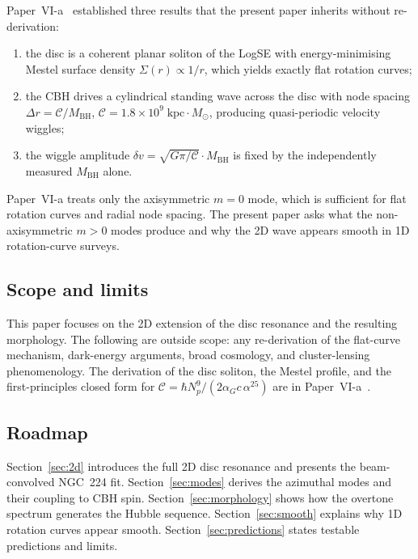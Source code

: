 \documentclass[11pt,a4paper]{article}
\begin{document}
Paper~VI-a~\cite{SSV-VIa} established three results that the present paper inherits
without re-derivation:
\begin{enumerate}
  \item the disc is a coherent planar soliton of the LogSE with energy-minimising Mestel
    surface density $\Sigma(r) \propto 1/r$, which yields exactly flat rotation curves;
  \item the CBH drives a cylindrical standing wave across the disc with node spacing
    $\Delta r = \mathcal{C}/M_\mathrm{BH}$, $\mathcal{C} = 1.8\times10^9\;\mathrm{kpc}
    \cdot M_\odot$, producing quasi-periodic velocity wiggles;
  \item the wiggle amplitude $\delta v = \sqrt{G\pi/\mathcal{C}}\cdot M_\mathrm{BH}$
    is fixed by the independently measured $M_\mathrm{BH}$ alone.
\end{enumerate}
Paper~VI-a treats only the axisymmetric $m=0$ mode, which is sufficient for flat rotation
curves and radial node spacing.  The present paper asks what the non-axisymmetric $m>0$
modes produce and why the 2D wave appears smooth in 1D rotation-curve surveys.

\subsection*{Scope and limits}

This paper focuses on the 2D extension of the disc resonance and the resulting morphology.
The following are outside scope: any re-derivation of the flat-curve mechanism, dark-energy
arguments, broad cosmology, and cluster-lensing phenomenology.  The derivation of the
disc soliton, the Mestel profile, and the first-principles closed form for
$\mathcal{C}=\hbar N_p^9/(2\alpha_G c\,\alpha^{25})$ are in
Paper~VI-a~\cite{SSV-VIa}.

\subsection*{Roadmap}

Section~\ref{sec:2d} introduces the full 2D disc resonance and presents the beam-convolved
NGC~224 fit.  Section~\ref{sec:modes} derives the azimuthal modes and their coupling to
CBH spin.  Section~\ref{sec:morphology} shows how the overtone spectrum generates the
Hubble sequence.  Section~\ref{sec:smooth} explains why 1D rotation curves appear smooth.
Section~\ref{sec:predictions} states testable predictions and limits.

\end{document}

